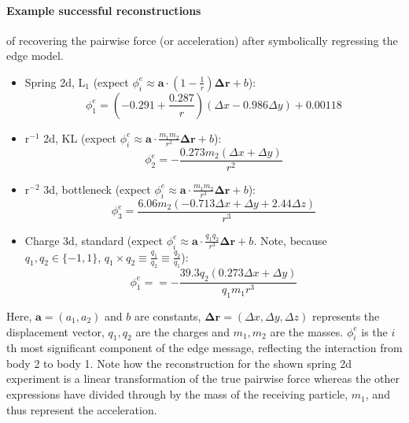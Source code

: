 \documentclass[11pt]{article}
\begin{document}
\paragraph*{Example successful reconstructions} of recovering the pairwise force (or acceleration) after symbolically regressing the edge model.
    \begin{itemize}
        \item
        Spring 2d, L$_1$ (expect $\phi^{e}_i \approx \mathbf{a} \cdot (1-\frac{1}{r}) \mathbf{\Delta {r}} + b$):
        $$
        \phi^{e}_1 = (-0.291 + \frac{0.287}{r})(\Delta x - 0.986 \Delta y) + 0.00118
        $$
        \item 
        r$^{-1}$ 2d, KL (expect $\phi^{e}_i \approx \mathbf{a} \cdot \frac{m_1 m_2}{r^2} \mathbf{\Delta r} + b$):
        $$\phi^{e}_2 = -\frac{0.273m_2(\Delta x + \Delta y)}{r^2}$$
        \item 
        r$^{-2}$ 3d, bottleneck (expect $\phi^{e}_i \approx \mathbf{a} \cdot \frac{m_1 m_2}{r^3} \mathbf{\Delta r} + b$):
        $$\phi^{e}_3 = \frac{6.06m_2(-0.713\Delta x + \Delta y + 2.44\Delta z)}{r^3}$$
        \item 
        Charge 3d, standard (expect $\phi^{e}_i \approx \mathbf{a} \cdot \frac{q_1 q_2}{r^3} \mathbf{\Delta r} + b$. Note, because $q_1, q_2 \in \{-1, 1\}$, $q_1 \times q_2 \equiv \frac{q_1}{q_2} \equiv \frac{q_2}{q_1}$):
        $$\phi^{e}_1 = = -\frac{39.3q_2(0.273\Delta x + \Delta y)}{ q_1 m_1r^3}$$
    \end{itemize}
    Here, $\mathbf{a} = (a_1, a_2)$ and $b$ are constants, $\mathbf{\Delta r} = (\Delta x, \Delta y, \Delta z)$ represents the displacement vector, $q_1, q_2$ are the charges and $m_1, m_2$ are the masses. $\phi^{e}_i$ is the $i$th most significant component of the edge message, reflecting the interaction from body 2 to body 1. Note how the reconstruction for the shown spring 2d experiment is a linear transformation of the true pairwise force whereas the other expressions have divided through by the mass of the receiving particle, $m_1$, and thus represent the acceleration.
\end{document}
